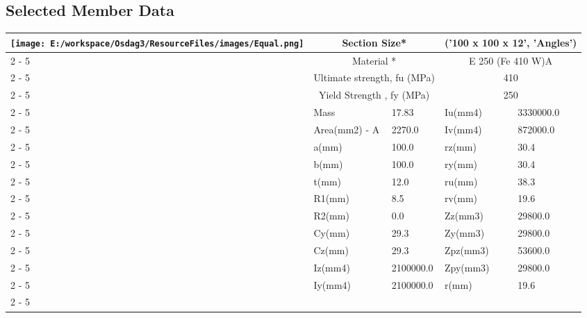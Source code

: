 \documentclass{article}%
\begin{document}
\subsection{Selected Member Data}%
\label{subsec:SelectedMemberData}%
\renewcommand{\arraystretch}{1.2}%
\begin{longtable}{|p{5cm}|p{2cm}|p{2cm}|p{2cm}|p{5cm}|}%
\hline%
\hline%
\multirow{15}{*}{\texttt{[image: E:/workspace/Osdag3/ResourceFiles/images/Equal.png]}}&\multicolumn{2}{|c|}{Section Size*}&\multicolumn{2}{|c|}{('100 x 100 x 12', 'Angles')}\\%
\cline{2%
-%
5}%
&\multicolumn{2}{|c|}{Material *}&\multicolumn{2}{|c|}{E 250 (Fe 410 W)A}\\%
\cline{2%
-%
5}%
&\multicolumn{2}{|c|}{Ultimate strength, fu (MPa)}&\multicolumn{2}{|c|}{410}\\%
\cline{2%
-%
5}%
&\multicolumn{2}{|c|}{Yield Strength , fy (MPa)}&\multicolumn{2}{|c|}{250}\\%
\cline{2%
-%
5}%
&Mass&17.83&Iu(mm4)&3330000.0\\%
\cline{2%
-%
5}%
&Area(mm2) {-} A&2270.0&Iv(mm4)&872000.0\\%
\cline{2%
-%
5}%
&a(mm)&100.0&rz(mm)&30.4\\%
\cline{2%
-%
5}%
&b(mm)&100.0&ry(mm)&30.4\\%
\cline{2%
-%
5}%
&t(mm)&12.0&ru(mm)&38.3\\%
\cline{2%
-%
5}%
&R1(mm)&8.5&rv(mm)&19.6\\%
\cline{2%
-%
5}%
&R2(mm)&0.0&Zz(mm3)&29800.0\\%
\cline{2%
-%
5}%
&Cy(mm)&29.3&Zy(mm3)&29800.0\\%
\cline{2%
-%
5}%
&Cz(mm)&29.3&Zpz(mm3)&53600.0\\%
\cline{2%
-%
5}%
&Iz(mm4)&2100000.0&Zpy(mm3)&29800.0\\%
\cline{2%
-%
5}%
&Iy(mm4)&2100000.0&r(mm)&19.6\\%
\cline{2%
-%
5}%
\hline%
\end{longtable}

%
\newpage%
\end{document}
